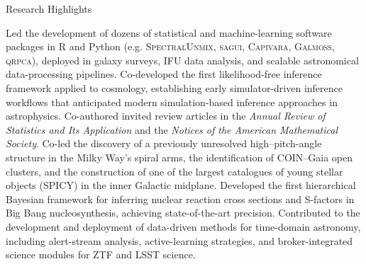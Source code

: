 \begin{rubric}{Research Highlights}

 Led the development of dozens of statistical and machine-learning software packages in R and Python (e.g. \textsc{SpectralUnmix}, \textsc{sagui}, \textsc{Capivara}, \textsc{Galmoss}, \textsc{qrpca}), deployed in galaxy surveys, IFU data analysis, and scalable astronomical data-processing pipelines.
%
 Co-developed the first likelihood-free inference framework applied to cosmology, establishing early simulator-driven inference workflows that anticipated modern simulation-based inference approaches in astrophysics.
%
\entry*[Astrostatistics] Co-authored invited review articles in the \emph{Annual Review of Statistics and Its Application} and the \emph{Notices of the American Mathematical Society}.
%
 Co-led the discovery of a previously unresolved high–pitch-angle structure in the Milky Way’s spiral arms, the identification of COIN--Gaia open clusters, and the construction of one of the largest catalogues of young stellar objects (SPICY) in the inner Galactic midplane.
%
 Developed the first hierarchical Bayesian framework for inferring nuclear reaction cross sections and S-factors in Big Bang nucleosynthesis, achieving state-of-the-art precision.
%
Contributed to the development and deployment of data-driven methods for time-domain astronomy, including alert-stream analysis, active-learning strategies, and broker-integrated science modules for ZTF and LSST science.

\end{rubric}
